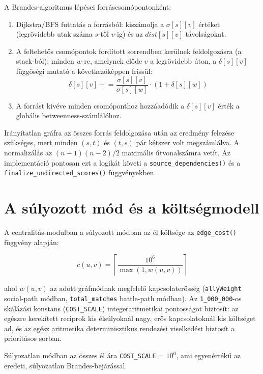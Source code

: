 ﻿\documentclass[a4paper,12pt]{report}
\begin{document}
A Brandes-algoritmus lépései forráscsomópontonként:

\begin{enumerate}
    \item Dijkstra/BFS futtatás a forrásból: kiszámolja a $\sigma[s][v]$ értéket (legrövidebb utak száma $s$-től $v$-ig) és az $dist[s][v]$ távolságokat.
    \item A feltehetős csomópontok fordított sorrendben kerülnek feldolgozásra (a stack-ból): minden $w$-re, amelynek előde $v$ a legrövidebb úton, a $\delta[s][v]$ függőségi mutató a következőképpen frissül:
    \begin{equation}
    \delta[s][v] \mathrel{+}= \frac{\sigma[s][v]}{\sigma[s][w]} \cdot (1 + \delta[s][w])
    \end{equation}
    \item A forrást kivéve minden csomóponthoz hozzáadódik a $\delta[s][v]$ érték a globális betweenness-számlálóhoz.
\end{enumerate}

Irányítatlan gráfra az összes forrás feldolgozása után az eredmény felezése szükséges, mert minden $(s, t)$ és $(t, s)$ pár kétszer volt megszámlálva. A normalizálás az $(n-1)(n-2)/2$ maximális útvonalszámra vetít. Az implementáció pontosan ezt a logikát követi a \texttt{source\_dependencies()} és a \texttt{finalize\_undirected\_scores()} függvényekben.

\section{A súlyozott mód és a költségmodell}

A centralitás-modulban a súlyozott módban az él költsége az \texttt{edge\_cost()} függvény alapján:

\begin{equation}
c(u,v) = \left\lceil \frac{10^6}{\max(1, w(u,v))} \right\rceil
\end{equation}

ahol $w(u,v)$ az adott gráfmódnak megfelelő kapcsolaterősség (\texttt{allyWeight} social-path módban, \texttt{total\_matches} battle-path módban). Az \texttt{1\_000\_000}-os skálázási konstans (\texttt{COST\_SCALE}) integeraritmetikai pontosságot biztosít: az egészre kerekített reciprok kis élsúlyoknál nagy, erős kapcsolatoknál kis költséget ad, és az egész aritmetika determinisztikus rendezési viselkedést biztosít a prioritásos sorban.

Súlyozatlan módban az összes él ára \texttt{COST\_SCALE} = $10^6$, ami egyenértékű az eredeti, súlyozatlan Brandes-bejárással.
\end{document}

